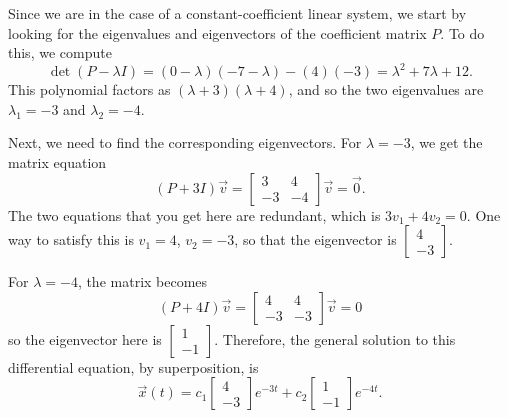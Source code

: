 \documentclass{ximera}
\begin{document}
\begin{exampleSol}
    Since we are in the case of a constant-coefficient linear system, we start by looking for the eigenvalues and eigenvectors of the coefficient matrix $P$. To do this, we compute
    \begin{equation*}
        \det(P - \lambda I) = (0-\lambda)(-7-\lambda) - (4)(-3) = \lambda^2 + 7\lambda + 12.
    \end{equation*}
    This polynomial factors as $(\lambda + 3)(\lambda + 4)$, and so the two eigenvalues are $\lambda_1 = -3$ and $\lambda_2 = -4$. 
    
    Next, we need to find the corresponding eigenvectors. For $\lambda = -3$, we get the matrix equation
    \begin{equation*}
        (P + 3I)\vec{v} = \begin{bmatrix} 3 & 4 \\ -3 & -4 \end{bmatrix} \vec{v} = \vec{0}. 
    \end{equation*}
    The two equations that you get here are redundant, which is $3v_1 + 4v_2 = 0$. One way to satisfy this is $v_1 = 4$, $v_2 = -3$, so that the eigenvector is $\left[\begin{smallmatrix} 4 \\ -3 \end{smallmatrix} \right]$. 
    
    For $\lambda = -4$, the matrix becomes
    \begin{equation*}
        (P + 4I)\vec{v} = \begin{bmatrix} 4 & 4 \\ -3 & -3 \end{bmatrix}\vec{v} = 0
    \end{equation*}
    so the eigenvector here is $\left[ \begin{smallmatrix} 1 \\ -1 \end{smallmatrix} \right]$. Therefore, the general solution to this differential equation, by superposition, is
    \begin{equation*}
        \vec{x}(t) = c_1 \begin{bmatrix} 4 \\ -3 \end{bmatrix}e^{-3t} + c_2 \begin{bmatrix} 1 \\ -1 \end{bmatrix}e^{-4t}.
    \end{equation*}
    

\end{exampleSol}
\end{document}
